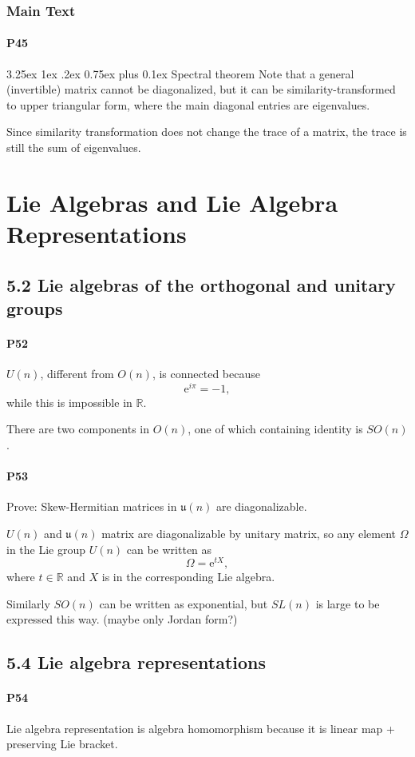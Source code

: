 \documentclass[12pt, letterpaper]{article}
\makeatletter
\renewcommand\subparagraph{\@startsection{subparagraph}{5}{\parindent}%
	{3.25ex \@plus1ex \@minus .2ex}%
	{0.75ex plus 0.1ex}%
	{\normalfont\normalsize\bfseries}}
\newcommand{\re}{\mathbb{R}}
\newcommand{\ee}{\mathrm{e}}
\newcommand{\red}[1]{{\color{red} #1}}
\newcommand{\blue}[1]{{\color{blue} #1}}
\theoremstyle{definition}
\theoremstyle{remark}
\theoremstyle{definition}
\theoremstyle{plain}
\makeatother
\begin{document}
	\subsubsection*{Main Text}

	\paragraph{P45}
	\subparagraph{Spectral theorem}
	\blue{Note that a general (invertible) matrix cannot be diagonalized}, but it can be similarity-transformed to upper triangular form,
	where the main diagonal entries are eigenvalues.
	
	Since similarity transformation does not change the trace of a matrix, the trace is still the sum of eigenvalues.
	
	\section{Lie Algebras and Lie Algebra Representations}
	\subsection*{5.2 Lie algebras of the orthogonal and unitary groups}
	\paragraph{P52}
	
	$U(n)$, different from $O(n)$, is connected because
	\[\ee^{i\pi}=-1, \]
	while this is impossible in $\re$.
	
	There are two components in $O(n)$, one of which containing identity is $SO(n)$.
	
	\paragraph{P53}
	
	\red{Prove: Skew-Hermitian matrices in $\mathfrak{u}(n)$ are diagonalizable.}
	
	$U(n)$ and $\mathfrak{u}(n)$ matrix are diagonalizable by unitary matrix, %
	so any element $\Omega$ in the Lie group $U(n)$
	can be written as
	\[\Omega=\ee^{tX}, \]
	where $t\in\re$ and $X$ is in the corresponding Lie algebra.
	
	Similarly $SO(n)$ can be written as exponential, but $SL(n)$ is large to be expressed this way.
	(maybe only Jordan form?)
	
	\subsection*{5.4 Lie algebra representations}
	\paragraph{P54}
	Lie algebra representation is algebra homomorphism because it is linear map + preserving Lie bracket.
\end{document}
